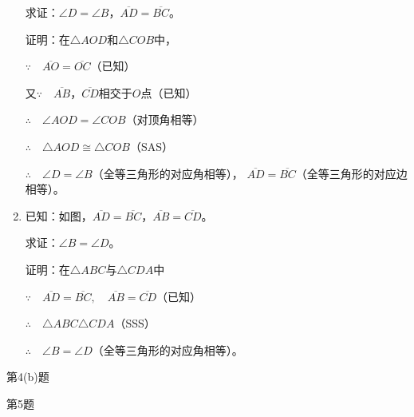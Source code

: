 \begin{Exercise}
\begin{question}
\begin{enumerate}
求证：$\angle D=\angle B$，$\overline{AD}=\overline{BC}$。

证明：在$\triangle AOD$和$\triangle COB$中，

$\because\quad \overline{AO}=\overline{OC}$（已知）

又$\because\quad \overline{AB}$，$\overline{CD}$相交于$O$点（已知）

$\therefore\quad \angle AOD=\angle COB$（对顶角相等）

$\therefore\quad \triangle AOD\cong \triangle COB$（SAS）

$\therefore\quad \angle D=\angle B$（全等三角形的对应角相等），
$\overline{AD}=\overline{BC}$（全等三角形的对应边相等）。

\item 已知：如图，$\overline{AD}=\overline{BC}$，$\overline{AB}=\overline{CD}$。

求证：$\angle B=\angle D$。

证明：在$\triangle ABC$与$\triangle CDA$中

$\because\quad \overline{AD}=\overline{BC},\quad \overline{AB}=\overline{CD}$（已知）

$\therefore\quad \triangle ABC\triangle CDA$（SSS）

$\therefore\quad \angle B=\angle D$（全等三角形的对应角相等）。


\end{enumerate}

\begin{figurehere}
    \begin{minipage}[b]{0.48\linewidth}
    \centering
\begin{tikzpicture}[>=latex, scale=1]
    \end{tikzpicture}
    \caption*{第4(b)题}
    \end{minipage}
    \begin{minipage}[b]{0.48\linewidth}
    \centering
    \begin{tikzpicture}[>=latex, scale=1]

    \end{tikzpicture}
    \caption*{第5题}
    \end{minipage}
    \end{figurehere}


\end{question}
\end{Exercise}
